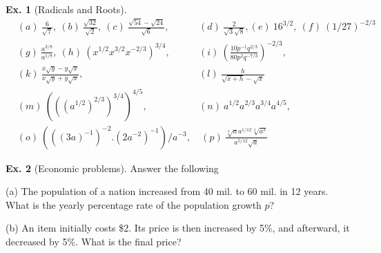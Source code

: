 \documentclass[10pt,a4paper]{book}
\theoremstyle{definition}\newtheorem{definition}{Definition}
\theoremstyle{definition}\newtheorem{fact}{Fact}
\theoremstyle{definition}\newtheorem{ex}{Ex.}
\theoremstyle{definition}\newtheorem{project}{Project}
\theoremstyle{definition}\newtheorem{problem}{Problem}
\theoremstyle{definition}\newtheorem{example}{Example}
\numberwithin{theorem}{chapter}
\numberwithin{corollary}{chapter}
\numberwithin{assumption}{chapter}
\numberwithin{definition}{chapter}
\numberwithin{prop}{chapter}
\numberwithin{notation}{chapter}
\numberwithin{problem}{chapter}
\numberwithin{example}{chapter}
\numberwithin{fact}{chapter}
\numberwithin{ex}{chapter}
\begin{document}
	\begin{ex}[Radicals and Roots]
		\begin{align*}
			& (a) \ \frac{6}{\sqrt{7}}, \ (b) \ \frac{\sqrt{32}}{\sqrt{2}}, \ (c) \ \frac{\sqrt{54}-\sqrt{24}}{\sqrt{6}}, &(d) \ \frac{2}{\sqrt{3}\sqrt{8}}, (e) \ 16^{3/2}, \ (f) \ (1/27)^{-2/3} &                                                                         \\
			& (g) \ \frac{a^{3/8}}{a^{1/8}}, \  (h) \ (x^{1/2} x^{3/2} x^{-2/3})^{3/4},                                     & (i) \ \left(\frac{10 p^{-1} q^{2/3}}{80 p^2 q^{-7/3}}\right)^{-2/3},    \\
			& (k) \ \frac{x\sqrt{y} - y\sqrt{x}}{x\sqrt{y} + y\sqrt{x}}, 
			& (l) \ \frac{h}{\sqrt{x+h} - \sqrt{x}} \\
			& (m) \ (((a^{1/2})^{2/3})^{3/4})^{4/5}, &(n) \ a^{1/2} a^{2/3} a^{3/4} a^{4/5},                               &                                                                         \\
			& (o) \ (((3a)^{-1})^{-2}. (2a^{-2})^{-1})/ a^{-3},                                                             & \ (p) \ \frac{\sqrt[3]{a} a^{1/12} \sqrt[4]{a^3}}{a^{5/12}\sqrt{a}}     
		\end{align*}
	\end{ex}
	
	\begin{ex}[Economic problems] Answer the following
		
		(a) The population of a nation increased from 40 mil. to 60 mil. in 12 years. What is the yearly percentage rate of the population growth $p$?
		
		(b) An item initially costs \$2. Its price is then increased by 5\%, and afterward, it decreased by 5\%. What is the final price?
	\end{ex}
	
\end{document}
